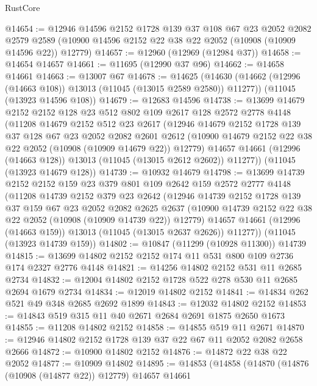 \begin{lexlean}{RustCore}
\begin{coremodule}
@14654 := @12946
    @14596
    @2152
    @1728
    @139
    @37
    @108
    @67
    @23
    @2052
    @2082
    @2579
    @2589
    (@10900 @14596 @2152 @22 @38 @22 @2052 (@10908 (@10909 @14596 @22)) @12779)
@14657 := @12960 (@12969 (@12984 @37))
@14658 := @14654 @14657
@14661 := @11695 (@12990 @37 @96)
@14662 := @14658 @14661
@14663 := @13007 @67
@14678 := @14625
    (@14630 (@14662 (@12996 (@14663 @108)) @13013 (@11045 (@13015 @2589 @2580)) @11277))
    (@11045 (@13923 @14596 @108))
@14679 := @12683 @14596
@14738 := @13699
    @14679
    @2152
    @2152
    @128
    @23
    @512
    @802
    @109
    @2617
    @128
    @2572
    @2778
    @4148
    (@11208
      @14679
      @2152
      @512
      @23
      @2617
      (@12946
        @14679
        @2152
        @1728
        @139
        @37
        @128
        @67
        @23
        @2052
        @2082
        @2601
        @2612
        (@10900 @14679 @2152 @22 @38 @22 @2052 (@10908 (@10909 @14679 @22)) @12779)
        @14657
        @14661
        (@12996 (@14663 @128))
        @13013
        (@11045 (@13015 @2612 @2602))
        @11277))
    (@11045 (@13923 @14679 @128))
@14739 := @10932 @14679
@14798 := @13699
    @14739
    @2152
    @2152
    @159
    @23
    @379
    @801
    @109
    @2642
    @159
    @2572
    @2777
    @4148
    (@11208
      @14739
      @2152
      @379
      @23
      @2642
      (@12946
        @14739
        @2152
        @1728
        @139
        @37
        @159
        @67
        @23
        @2052
        @2082
        @2625
        @2637
        (@10900 @14739 @2152 @22 @38 @22 @2052 (@10908 (@10909 @14739 @22)) @12779)
        @14657
        @14661
        (@12996 (@14663 @159))
        @13013
        (@11045 (@13015 @2637 @2626))
        @11277))
    (@11045 (@13923 @14739 @159))
@14802 := @10847 (@11299 (@10928 @11300)) @14739
@14815 := @13699 @14802 @2152 @2152 @174 @11 @531 @800 @109 @2736 @174 @2327 @2776 @4148
@14821 := @14256 @14802 @2152 @531 @11 @2685 @2734
@14832 := @12004 @14802 @2152 @1728 @522 @278 @530 @11 @2685 @2694 @1679 @2734
@14834 := @12019 @14802 @2152
@14841 := @14834 @262 @521 @49 @348 @2685 @2692 @1899
@14843 := @12032 @14802 @2152
@14853 := @14843 @519 @315 @11 @40 @2671 @2684 @2691 @1875 @2650 @1673
@14855 := @11208 @14802 @2152
@14858 := @14855 @519 @11 @2671
@14870 := @12946 @14802 @2152 @1728 @139 @37 @22 @67 @11 @2052 @2082 @2658 @2666
@14872 := @10900 @14802 @2152
@14876 := @14872 @22 @38 @22 @2052
@14877 := @10909 @14802
@14895 := @14853
    (@14858
      (@14870
        (@14876 (@10908 (@14877 @22)) @12779)
        @14657
        @14661

\end{coremodule}
\end{lexlean}
